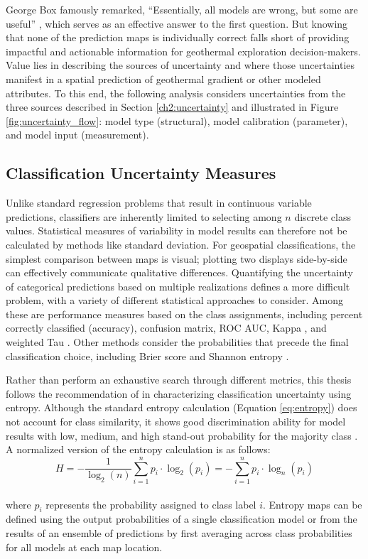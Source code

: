 George Box famously remarked, ``Essentially, all models are wrong, but some are useful'' \citep{box_empirical_1987}, which serves as an effective answer to the first question. But knowing that none of the prediction maps is individually correct falls short of providing impactful and actionable information for geothermal exploration decision-makers. Value lies in describing the sources of uncertainty and where those uncertainties manifest in a spatial prediction of geothermal gradient or other modeled attributes. To this end, the following analysis considers uncertainties from the three sources described in Section \ref{ch2:uncertainty} and illustrated in Figure \ref{fig:uncertainty_flow}: model type (structural), model calibration (parameter), and model input (measurement).

\subsection{Classification Uncertainty Measures}\label{ch3:uncertainty_measures}
Unlike standard regression problems that result in continuous variable predictions, classifiers are inherently limited to selecting among $n$ discrete class values. Statistical measures of variability in model results can therefore not be calculated by methods like standard deviation. For geospatial classifications, the simplest comparison between maps is visual; plotting two displays side-by-side can effectively communicate qualitative differences. Quantifying the uncertainty of categorical predictions based on multiple realizations defines a more difficult problem, with a variety of different statistical approaches to consider. Among these are performance measures based on the class assignments, including percent correctly classified (accuracy), confusion matrix, ROC AUC, Kappa \citep{cohen_coefficient_1960}, and weighted Tau \citep{ma_tau_1995}. Other methods consider the probabilities that precede the final classification choice, including Brier score \citep{brier_verification_1950} and Shannon entropy \citep{shannon_mathematical_1948}.

Rather than perform an exhaustive search through different metrics, this thesis follows the recommendation of \citep{beaudette_accuracy_2020} in characterizing classification uncertainty using entropy. Although the standard entropy calculation (Equation \ref{eq:entropy}) does not account for class similarity, it shows good discrimination ability for model results with low, medium, and high stand-out probability for the majority class \citep{beaudette_accuracy_2020}. A normalized version of the entropy calculation is as follows:
\begin{equation}
\label{eq:norm_entropy}
    H = -\frac{1}{\log_2{(n)}}\sum_{i=1}^{n}{p_i \cdot \log_2{(p_i)}} = -\sum_{i=1}^{n}{p_i \cdot \log_n{(p_i)}}
\end{equation}
\\
where $p_i$ represents the probability assigned to class label $i$. Entropy maps can be defined using the output probabilities of a single classification model or from the results of an ensemble of predictions by first averaging across class probabilities for all models at each map location.
\vfill
